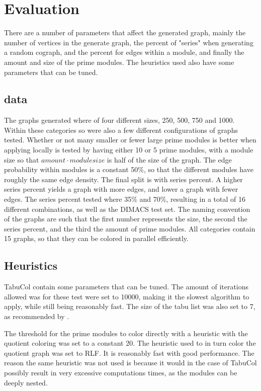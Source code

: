 \documentclass[a4paper]{article}
\begin{document}
\section{Evaluation}
\label{sec:Evaluation}
There are a number of parameters that affect the generated graph, mainly the
number of vertices in the generate graph, the percent of "series" when generating
a random cograph, and the percent for edges within a module, and finally the
amount and size of the prime modules. The heuristics used also have some
parameters that can be tuned.

\subsection{data}

The graphs generated where of four different sizes, 250, 500, 750 and 1000. 
Within these categories so were also a few different configurations of graphs
tested. Whether or not many smaller or fewer large prime modules is better when
applying locally is tested by having either 10 or 5 prime modules, with a module
size so that $amount \cdot module size$ is half of the size of the graph. The
edge probability within modules is a  constant 50\%, so that the different
modules have roughly the same edge density. The final split is with series
percent. A higher series percent yields a graph with more edges, and lower a
graph with fewer  edges. The series percent tested where 35\% and 70\%,
resulting in a total of 16 different combinations, as well as the DIMACS test
set. The naming convention of the graphs are such that the first number
represents the size, the second the series percent, and the third the amount of
prime modules. All categories contain 15 graphs, so that they can be colored in
parallel efficiently.


\subsection{Heuristics}
TabuCol contain some parameters that can be tuned. The amount of
iterations allowed was for these test were set to 10000, making it the slowest
algorithm to apply, while still being reasonably fast. The size of the tabu list 
was also set to 7, as recommended by \cite{1990}.

The threshold for the prime modules to color directly with a heuristic with
the quotient coloring was set to a constant 20. The heuristic used to in turn
color the quotient graph was set to RLF. It is reasonably fast with good
performance. The reason the same heuristic was not used is because it would in
the case of TabuCol possibly result in very excessive computations times, as the 
modules can be deeply nested.
\end{document}
